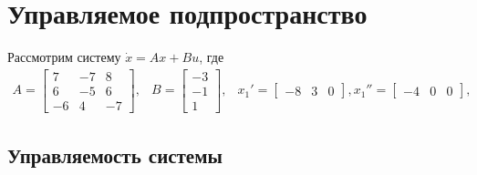 \section{Управляемое подпространство}

Рассмотрим систему $\dot{x} = Ax + Bu$, где 
\begin{equation}
    \begin{array}{ccc}
        A = \begin{bmatrix}
            7 & -7 & 8 \\
            6 & -5 & 6 \\
            -6 & 4 & -7
        \end{bmatrix}, &
        B = \begin{bmatrix}
            -3 \\
            -1 \\
            1
        \end{bmatrix}, &
        x_1' = \begin{bmatrix}
            -8 & 3 & 0
        \end{bmatrix},
        x_1'' = \begin{bmatrix}
            -4 & 0 & 0
        \end{bmatrix},
    \end{array}
\end{equation}

\subsection{Управляемость системы}
